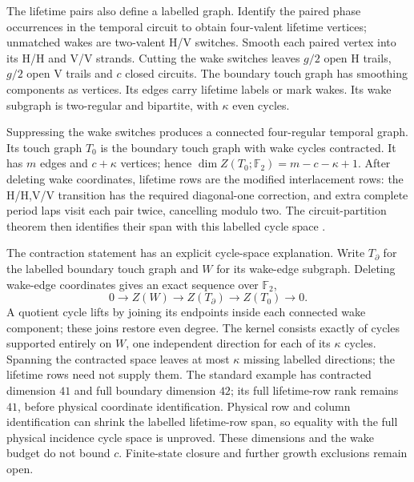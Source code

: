 \documentclass[11pt,letterpaper]{article}
\newcommand{\F}{\mathbb F}
\begin{document}
The lifetime pairs also define a labelled graph. Identify the paired phase
occurrences in the temporal circuit to obtain four-valent lifetime
vertices; unmatched wakes are two-valent H/V switches. Smooth each paired
vertex into its H/H and V/V strands. Cutting the wake switches leaves
$g/2$ open H trails, $g/2$ open V trails and $c$ closed circuits.
The boundary touch graph has smoothing components as vertices. Its edges
carry lifetime labels or mark wakes. Its wake subgraph is
two-regular and bipartite, with $\kappa$ even cycles.

Suppressing the wake switches produces a connected four-regular temporal
graph. Its touch graph $T_0$ is the boundary touch graph with wake
cycles contracted. It has $m$ edges and $c+\kappa$ vertices; hence
$\dim Z(T_0;\F_2)=m-c-\kappa+1$.
After deleting wake coordinates, lifetime rows are the modified
interlacement rows: the H/H,V/V transition has the required diagonal-one
correction, and extra complete period laps visit each pair twice, cancelling
modulo two. The circuit-partition theorem then identifies their span with
this labelled cycle space \cite{Traldi2025interlacement}.

The contraction statement has an explicit cycle-space explanation.
Write $T_{\partial}$ for the labelled boundary touch graph and $W$
for its wake-edge subgraph. Deleting wake-edge coordinates gives
an exact sequence over $\F_2$,
\[
0\longrightarrow Z(W)\longrightarrow Z(T_{\partial})
 \longrightarrow Z(T_0)\longrightarrow0.
\]
A quotient cycle lifts by joining its endpoints inside each connected
wake component; these joins restore even degree. The kernel consists
exactly of cycles supported entirely on $W$, one independent direction
for each of its $\kappa$ cycles. Spanning the contracted space leaves at most $\kappa$ missing labelled
directions; the lifetime rows need not supply them. The standard example has contracted
dimension $41$ and full boundary dimension $42$; its full lifetime-row
rank remains $41$, before physical coordinate identification.
Physical row and column identification can shrink the labelled lifetime-row
span, so equality with the full physical incidence cycle space is unproved.
These dimensions and the wake budget do not bound $c$. Finite-state
closure and further growth exclusions remain open.
\end{document}
